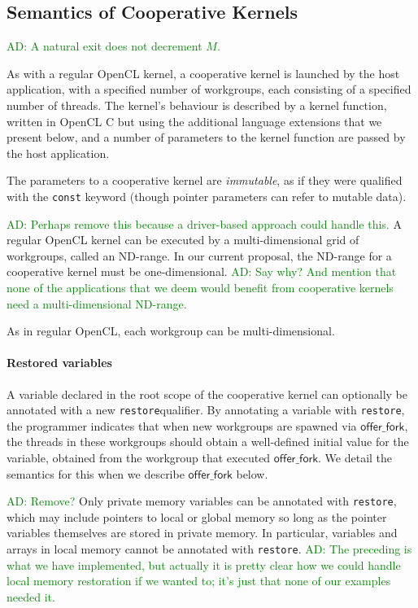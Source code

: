\documentclass[nocopyrightspace]{sigplanconf-pldi16}
\newcommand{\ADComment}[1]{\textcolor{green}{AD: #1}}
\newcommand{\restore}{\texttt{restore}}
\newcommand{\offerfork}{\mathsf{offer\_fork}}
\begin{document}
\subsection{Semantics of Cooperative Kernels}\label{sec:semantics}

\ADComment{A natural exit does not decrement $M$.}

As with a regular OpenCL kernel, a cooperative kernel is launched by
the host application, with a specified number of workgroups, each
consisting of a specified number of threads.  The kernel's behaviour
is described by a kernel function, written in OpenCL C but using the
additional language extensions that we present below, and a number of
parameters to the kernel function are passed by the host application.

The parameters to a cooperative kernel are \emph{immutable}, as if
they were qualified with the \texttt{const} keyword (though pointer
parameters can refer to mutable data).

\ADComment{Perhaps remove this because a driver-based approach could handle this.}
A regular OpenCL kernel can be executed by a multi-dimensional grid of
workgroups, called an ND-range.  In our current proposal, the ND-range
for a cooperative kernel must be one-dimensional.  \ADComment{Say why?
  And mention that none of the applications that we deem would benefit
  from cooperative kernels need a multi-dimensional ND-range.}

As in regular OpenCL, each workgroup can be multi-dimensional.

\paragraph{Restored variables}

A variable declared in the root scope of the cooperative kernel can
optionally be annotated with a new \restore qualifier.  By
annotating a variable with \restore, the programmer indicates
that when new workgroups are spawned via $\offerfork$, the threads in
these workgroups should obtain a well-defined initial value for the
variable, obtained from the workgroup that executed $\offerfork$.  We
detail the semantics for this when we describe $\offerfork$ below.

\ADComment{Remove?}
Only private memory variables can be annotated with \restore,
which may include pointers to local or global memory so long as the
pointer variables themselves are stored in private memory.  In
particular, variables and arrays in local memory cannot be annotated
with \restore.  \ADComment{The preceding is what we have
  implemented, but actually it is pretty clear how we could handle
  local memory restoration if we wanted to; it's just that none of our
  examples needed it.}
\end{document}

